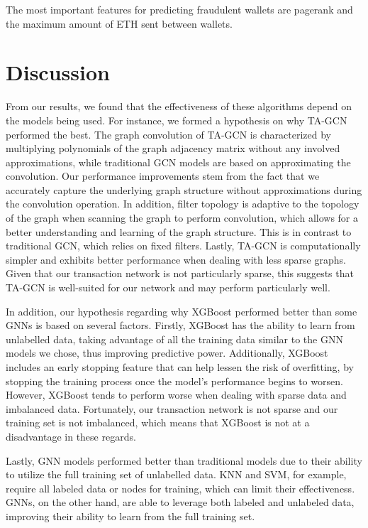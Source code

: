 \documentclass{article}
\begin{document}
    The most important features for predicting fraudulent wallets are pagerank and the maximum amount of ETH sent between wallets.
    
\section{Discussion}
    From our results, we found that the effectiveness of these algorithms depend on the models being used. For instance, we formed a hypothesis on why TA-GCN performed the best. The graph convolution of TA-GCN is characterized by multiplying polynomials of the graph adjacency matrix without any involved approximations, while traditional GCN models are based on approximating the convolution. Our performance improvements stem from the fact that we accurately capture the underlying graph structure without approximations during the convolution operation. In addition, filter topology is adaptive to the topology of the graph when scanning the graph to perform convolution, which allows for a better understanding and learning of the graph structure. This is in contrast to traditional GCN, which relies on fixed filters. Lastly, TA-GCN is computationally simpler and exhibits better performance when dealing with less sparse graphs. Given that our transaction network is not particularly sparse, this suggests that TA-GCN is well-suited for our network and may perform particularly well. 

    In addition, our hypothesis regarding why XGBoost performed better than some GNNs is based on several factors. Firstly, XGBoost has the ability to learn from unlabelled data, taking advantage of all the training data similar to the GNN models we chose, thus improving predictive power. Additionally, XGBoost includes an early stopping feature that can help lessen the risk of overfitting, by stopping the training process once the model’s performance begins to worsen. However, XGBoost tends to perform worse when dealing with sparse data and imbalanced data. Fortunately, our transaction network is not sparse and our training set is not imbalanced, which means that XGBoost is not at a disadvantage in these regards. 

    Lastly, GNN models performed better than traditional models due to their ability to utilize the full training set of unlabelled data. KNN and SVM, for example, require all labeled data or nodes for training, which can limit their effectiveness. GNNs, on the other hand, are able to leverage both labeled and unlabeled data, improving their ability to learn from the full training set.
\end{document}
